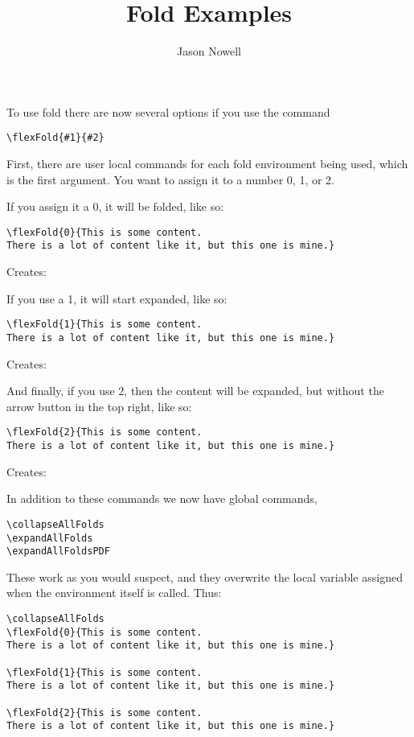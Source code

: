 \documentclass{ximera}
\title{Fold Examples}
\author{Jason Nowell}
\begin{document}
\maketitle


To use fold there are now several options if you use the command 
\begin{verbatim}
\flexFold{#1}{#2}
\end{verbatim}

First, there are user local commands for each fold environment being used, which is the first argument. You want to assign it to a number 0, 1, or 2.

If you assign it a 0, it will be folded, like so:
\begin{verbatim}
\flexFold{0}{This is some content. 
There is a lot of content like it, but this one is mine.}
\end{verbatim}

Creates:

If you use a 1, it will start expanded, like so:

\begin{verbatim}
\flexFold{1}{This is some content. 
There is a lot of content like it, but this one is mine.}
\end{verbatim}

Creates:

And finally, if you use 2, then the content will be expanded, but without the arrow button in the top right, like so:
\begin{verbatim}
\flexFold{2}{This is some content. 
There is a lot of content like it, but this one is mine.}
\end{verbatim}

Creates:

In addition to these commands we now have global commands,
\begin{verbatim}
\collapseAllFolds
\expandAllFolds
\expandAllFoldsPDF
\end{verbatim}

These work as you would suspect, and they overwrite the local variable assigned when the environment itself is called. Thus:

\begin{verbatim}
\collapseAllFolds
\flexFold{0}{This is some content. 
There is a lot of content like it, but this one is mine.}

\flexFold{1}{This is some content. 
There is a lot of content like it, but this one is mine.}

\flexFold{2}{This is some content. 
There is a lot of content like it, but this one is mine.}
\end{verbatim}
\end{document}
